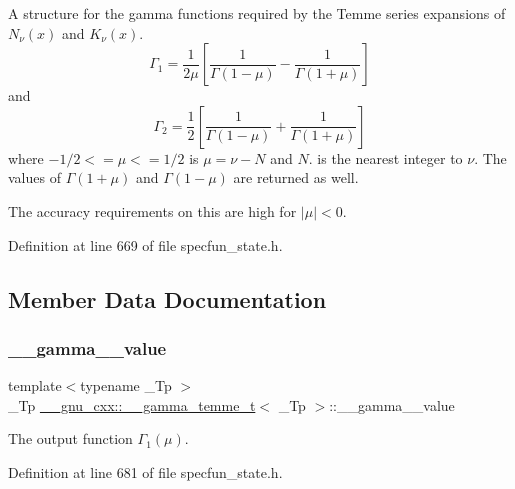 A structure for the gamma functions required by the Temme series expansions of $ N_\nu(x) $ and $ K_\nu(x) $. \[ \Gamma_1 = \frac{1}{2\mu} \left[\frac{1}{\Gamma(1 - \mu)} - \frac{1}{\Gamma(1 + \mu)}\right] \] and \[ \Gamma_2 = \frac{1}{2} \left[\frac{1}{\Gamma(1 - \mu)} + \frac{1}{\Gamma(1 + \mu)}\right] \] where $ -1/2 <= \mu <= 1/2 $ is $ \mu = \nu - N $ and $ N $. is the nearest integer to $ \nu $. The values of $ \Gamma(1 + \mu) $ and $ \Gamma(1 - \mu) $ are returned as well. 

The accuracy requirements on this are high for $ |\mu| < 0 $. 

Definition at line 669 of file specfun\+\_\+state.\+h.



\subsection{Member Data Documentation}
\mbox{\label{struct____gnu__cxx_1_1____gamma__temme__t_a5cd3cdcf5479d232d3ea118c69198215}} 
\subsubsection{\texorpdfstring{\+\_\+\+\_\+gamma\+\_\+\_\+value}{\_\_gamma\_1\_value}}
{\footnotesize\ttfamily template$<$typename \+\_\+\+Tp $>$ \\
\+\_\+\+Tp \hyperlink{struct____gnu__cxx_1_1____gamma__temme__t}{\+\_\+\+\_\+gnu\+\_\+cxx\+::\+\_\+\+\_\+gamma\+\_\+temme\+\_\+t}$<$ \+\_\+\+Tp $>$\+::\+\_\+\+\_\+gamma\+\_\+\_\+value}



The output function $ \Gamma_1(\mu) $. 



Definition at line 681 of file specfun\+\_\+state.\+h.

\mbox{\label{struct____gnu__cxx_1_1____gamma__temme__t_af3113befce3b6bc9c561472fbaff4520}} 
